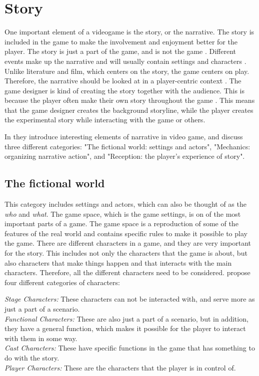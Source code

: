 \section{Story}
One important element of a videogame is the story, or the narrative. The story is included in the game to make the involvement and enjoyment better for the player. The story is just a part of the game, and is not the game \cite{umlapproach}.  Different events make up the narrative and will usually contain settings and characters \cite{understandingvg}. Unlike literature and film, which centers on the story, the game centers on play. Therefore, the narrative should be looked at in a player-centric context \cite{gametheory}. The game designer is kind of creating the story together with the audience. This is because the player often make their own story throughout the game \cite{umlapproach}. This means that the game designer creates the background storyline, while the player creates the experimental story while interacting with the game or others. 

In \cite{understandingvg} they introduce interesting elements of narrative in video game, and discuss three different categories: "The fictional world: settings and actors", "Mechanics: organizing narrative action", and "Reception: the player’s experience of story".

\subsection{The fictional world}
This category includes settings and actors, which can also be thought of as the \emph{who} and \emph{what}. The game space, which is the game settings, is on of the most important parts of a game. The game space is a reproduction of some of the features of the real world and contains specific rules to make it possible to play the game. There are different characters in a game, and they are very important for the story. This includes not only the characters that the game is about, but also characters that make things happen and that interacts with the main characters. Therefore, all the different characters need to be considered. \cite{understandingvg} propose four different categories of characters: 

\emph{Stage Characters:} These characters can not be interacted with, and serve more as just a part of a scenario. \\
\emph{Functional Characters:} These are also just a part of a scenario, but in addition, they have a general function, which makes it possible for the player to interact with them in some way. \\
\emph{Cast Characters:} These have specific functions in the game that has something to do with the story. \\
\emph{Player Characters:} These are the characters that the player is in control of. 

